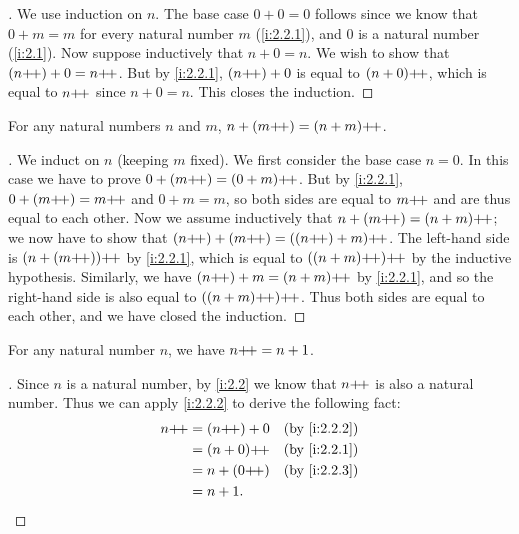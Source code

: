 \begin{proof}[]
  We use induction on \(n\).
  The base case \(0 + 0 = 0\) follows since we know that \(0 + m = m\) for every natural number \(m\) (\cref{i:2.2.1}), and \(0\) is a natural number (\cref{i:2.1}).
  Now suppose inductively that \(n + 0 = n\).
  We wish to show that \((n{+}\!{+}) + 0 = n{+}\!{+}\).
  But by \cref{i:2.2.1}, \((n{+}\!{+}) + 0\) is equal to \((n + 0){+}\!{+}\), which is equal to \(n{+}\!{+}\) since \(n + 0 = n\).
  This closes the induction.
\end{proof}

\begin{lem}\label{i:2.2.3}
  For any natural numbers \(n\) and \(m\), \(n + (m{+}\!{+}) = (n + m){+}\!{+}\).
\end{lem}

\begin{proof}[]
  We induct on \(n\) (keeping \(m\) fixed).
  We first consider the base case \(n = 0\).
  In this case we have to prove \(0 + (m{+}\!{+}) = (0 + m){+}\!{+}\).
  But by \cref{i:2.2.1}, \(0 + (m{+}\!{+}) = m{+}\!{+}\) and \(0 + m = m\), so both sides are equal to \(m{+}\!{+}\) and are thus equal to each other.
  Now we assume inductively that \(n + (m{+}\!{+}) = (n + m){+}\!{+}\);
  we now have to show that \((n{+}\!{+}) + (m{+}\!{+}) = ((n{+}\!{+}) + m){+}\!{+}\).
  The left-hand side is \((n + (m{+}\!{+})){+}\!{+}\) by \cref{i:2.2.1}, which is equal to \(((n+m){+}\!{+}){+}\!{+}\) by the inductive hypothesis.
  Similarly, we have \((n{+}\!{+}) + m = (n + m){+}\!{+}\) by \cref{i:2.2.1}, and so the right-hand side is also equal to \(((n + m){+}\!{+}){+}\!{+}\).
  Thus both sides are equal to each other, and we have closed the induction.
\end{proof}

\begin{ac}\label{i:ac:2.2.2}
  For any natural number \(n\), we have \(n{+}\!{+} = n + 1\).
\end{ac}

\begin{proof}[]
  Since \(n\) is a natural number, by \cref{i:2.2} we know that \(n{+}\!{+}\) is also a natural number.
  Thus we can apply \cref{i:2.2.2} to derive the following fact:
  \begin{align*}
    n\pp & = (n\pp) + 0 &  & \by{i:2.2.2} \\
         & = (n + 0)\pp &  & \by{i:2.2.1} \\
         & = n + (0\pp) &  & \by{i:2.2.3} \\
         & = n + 1.
  \end{align*}
\end{proof}

